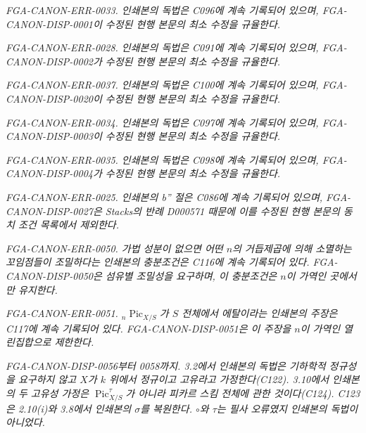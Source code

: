 \par\smallskip
\begingroup\footnotesize
\noindent\textit{FGA-CANON-ERR-0033. 인쇄본의 독법은 C096에 계속 기록되어 있으며, FGA-CANON-DISP-0001이 수정된 현행 본문의 최소 수정을 규율한다.}\par
\noindent\textit{FGA-CANON-ERR-0028. 인쇄본의 독법은 C091에 계속 기록되어 있으며, FGA-CANON-DISP-0002가 수정된 현행 본문의 최소 수정을 규율한다.}\par
\noindent\textit{FGA-CANON-ERR-0037. 인쇄본의 독법은 C100에 계속 기록되어 있으며, FGA-CANON-DISP-0020이 수정된 현행 본문의 최소 수정을 규율한다.}\par
\noindent\textit{FGA-CANON-ERR-0034. 인쇄본의 독법은 C097에 계속 기록되어 있으며, FGA-CANON-DISP-0003이 수정된 현행 본문의 최소 수정을 규율한다.}\par
\noindent\textit{FGA-CANON-ERR-0035. 인쇄본의 독법은 C098에 계속 기록되어 있으며, FGA-CANON-DISP-0004가 수정된 현행 본문의 최소 수정을 규율한다.}\par
\noindent\textit{FGA-CANON-ERR-0025. 인쇄본의 b'' 절은 C086에 계속 기록되어 있으며, FGA-CANON-DISP-0027은 Stacks의 반례 D000571 때문에 이를 수정된 현행 본문의 동치 조건 목록에서 제외한다.}\par
\noindent\textit{FGA-CANON-ERR-0050. 가법 성분이 없으면 어떤 $n$의 거듭제곱에 의해 소멸하는 꼬임점들이 조밀하다는 인쇄본의 충분조건은 C116에 계속 기록되어 있다. FGA-CANON-DISP-0050은 섬유별 조밀성을 요구하며, 이 충분조건은 $n$이 가역인 곳에서만 유지한다.}\par
\noindent\textit{FGA-CANON-ERR-0051. ${}_n\operatorname{Pic}_{X/S}$가 $S$ 전체에서 에탈이라는 인쇄본의 주장은 C117에 계속 기록되어 있다. FGA-CANON-DISP-0051은 이 주장을 $n$이 가역인 열린집합으로 제한한다.}\par
\noindent\textit{FGA-CANON-DISP-0056부터 0058까지. 3.2에서 인쇄본의 독법은 기하학적 정규성을 요구하지 않고 $X$가 $k$ 위에서 정규이고 고유라고 가정한다(C122). 3.10에서 인쇄본의 두 고유성 가정은 $\operatorname{Pic}_{X/S}^{\tau}$가 아니라 피카르 스킴 전체에 관한 것이다(C124). C123은 2.10(i)와 3.8에서 인쇄본의 $\sigma$를 복원한다. $\circ$와 $\tau$는 필사 오류였지 인쇄본의 독법이 아니었다.}\par
\endgroup
